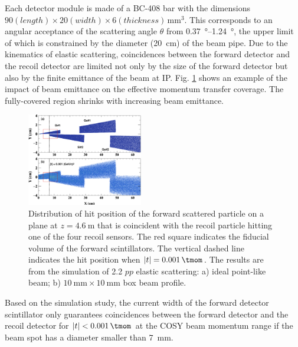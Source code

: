 \documentclass[number,5p]{elsarticle}
\begin{document}
Each detector module is made of a BC-408 bar with the dimensions $90 (length) \times 20 (width) \times 6
(thickness)\,\si{\mm\tothe{3}}$.
This corresponds to an angular acceptance of the scattering angle $\theta$ from
\SIrange[range-units=repeat]{0.37}{1.24}{\degree}, the upper limit of which is
constrained by the diameter (\SI{20}{\cm}) of the beam pipe.
Due to the kinematics of elastic scattering, coincidences between the forward
detector and the recoil detector are limited not only by the size of the forward
detector but also by the finite emittance of the beam at IP.
Fig. \ref{fig:forward_acceptance} shows an example of the impact of beam emittance on the
effective momentum transfer coverage.
The fully-covered region shrinks with increasing beam emittance. 
\begin{figure}[htb]
  \centering
  \includegraphics[width=0.45\textwidth]{./fwd_acceptance.png}
  \caption{
    Distribution of hit position of the forward scattered particle on a plane at
    $z=\SI{4.6}{\m}$ that is coincident with the recoil particle hitting one of
    the four recoil sensors.
    The red square indicates the fiducial volume of the forward scintillators.
    The vertical dashed line indicates the hit position when $|t| = \SI{0.001}{\tmom}$.
    The results are from the simulation of \SI{2.2}{\momentum}
    $pp$ elastic scattering: a) ideal point-like beam; b) $\SI{10}{\mm}\times\SI{10}{\mm}$ box beam profile.
    }
  \label{fig:forward_acceptance}
\end{figure}
Based on the simulation study, the current width of the forward detector
scintillator only guarantees coincidences between the forward detector and the
recoil detector for $|t| < \SI{0.001}{\tmom}$ at the COSY beam momentum range if the beam spot has a diameter smaller than \SI{7}{\mm}.
\end{document}
